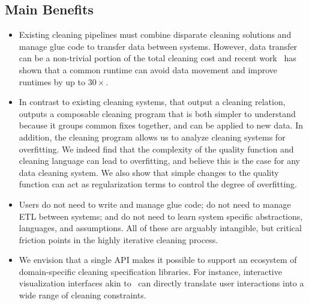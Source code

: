 \subsection{Main Benefits}
\begin{itemize}[leftmargin=*, topsep=0mm, itemsep=0mm]
\item {} Existing cleaning pipelines must combine disparate cleaning solutions and manage glue code to transfer data between systems.  However, data transfer can be a non-trivial portion of the total cleaning cost and recent work~\cite{palkar2017weld} has shown that a common runtime can avoid data movement and improve runtimes by up to $30\times$.  

\item {} In contrast to existing cleaning systems, that output a cleaning relation, \sys outputs a composable cleaning program that is both simpler to understand because it groups common fixes together, and can be applied to new data.  In addition, the cleaning program allows us to analyze cleaning systems for overfitting.  We indeed find that the complexity of the quality function and cleaning language can lead to overfitting, and believe this is the case for any data cleaning system.  We also show that simple changes to the quality function can act as regularization terms to control the degree of overfitting.

\item {}  Users do not need to write and manage glue code; do not need to manage ETL between systems; and do not need to learn system specific abstractions, languages, and assumptions.  All of these are arguably intangible, but critical friction points in the highly iterative cleaning process.  

\item {} We envision that a single API makes it possible to support an ecosystem of domain-specific cleaning specification libraries.  For instance,  interactive visualization interfaces akin to~\cite{trifacta,kandel2011wrangler,DBLP:journals/pvldb/0002M13,wu2012demonstration} can directly translate user interactions into a wide range of cleaning constraints.   
\end{itemize}




